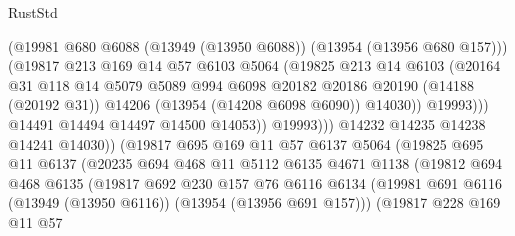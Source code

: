 \begin{lexlean}{RustStd}
\begin{coremodule}
                              (@19981
                                @680
                                @6088
                                (@13949 (@13950 @6088))
                                (@13954 (@13956 @680 @157)))
                              (@19817
                                @213
                                @169
                                @14
                                @57
                                @6103
                                @5064
                                (@19825
                                  @213
                                  @14
                                  @6103
                                  (@20164
                                    @31
                                    @118
                                    @14
                                    @5079
                                    @5089
                                    @994
                                    @6098
                                    @20182
                                    @20186
                                    @20190
                                    (@14188 (@20192 @31))
                                    @14206
                                    (@13954 (@14208 @6098 @6090))
                                    @14030))
                                @19993)))
                          @14491
                          @14494
                          @14497
                          @14500
                          @14053))
                      @19993)))
                @14232
                @14235
                @14238
                @14241
                @14030))
            (@19817
              @695
              @169
              @11
              @57
              @6137
              @5064
              (@19825
                @695
                @11
                @6137
                (@20235
                  @694
                  @468
                  @11
                  @5112
                  @6135
                  @4671
                  @1138
                  (@19812
                    @694
                    @468
                    @6135
                    (@19817
                      @692
                      @230
                      @157
                      @76
                      @6116
                      @6134
                      (@19981 @691 @6116 (@13949 (@13950 @6116)) (@13954 (@13956 @691 @157)))
                      (@19817
                        @228
                        @169
                        @11
                        @57

\end{coremodule}
\end{lexlean}
